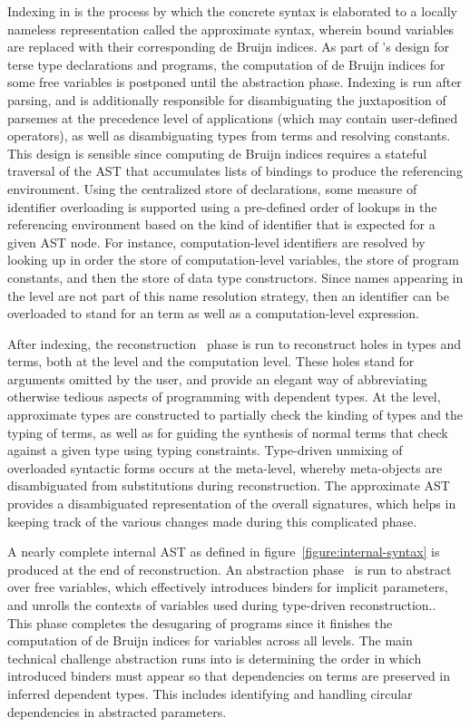 Indexing in \Beluga is the process by which the concrete syntax is elaborated to a locally nameless representation called the approximate syntax, wherein bound variables are replaced with their corresponding de Bruijn indices.
As part of \Beluga's design for terse type declarations and programs, the computation of de Bruijn indices for some free variables is postponed until the abstraction phase.
Indexing is run after parsing, and is additionally responsible for disambiguating the juxtaposition of \LF parsemes at the precedence level of applications (which may contain user-defined operators), as well as disambiguating \LF types from terms and resolving constants.
This design is sensible since computing de Bruijn indices requires a stateful traversal of the \ac{AST} that accumulates lists of bindings to produce the referencing environment.
Using the centralized store of declarations, some measure of identifier overloading is supported using a pre-defined order of lookups in the referencing environment based on the kind of identifier that is expected for a given \ac{AST} node.
For instance, computation-level identifiers are resolved by looking up in order the store of computation-level variables, the store of program constants, and then the store of data type constructors.
Since names appearing in the \LF level are not part of this name resolution strategy, then an identifier can be overloaded to stand for an \LF term as well as a computation-level expression.

After indexing, the reconstruction~\cite{pientka2013insider} phase is run to reconstruct holes in types and terms, both at the \LF level and the computation level.
These holes stand for arguments omitted by the user, and provide an elegant way of abbreviating otherwise tedious aspects of programming with dependent types.
At the \LF level, approximate types are constructed to partially check the kinding of \LF types and the typing of \LF terms, as well as for guiding the synthesis of normal terms that check against a given type using typing constraints.
Type-driven unmixing of overloaded syntactic forms occurs at the meta-level, whereby meta-objects are disambiguated from substitutions during reconstruction.
The approximate \ac{AST} provides a disambiguated representation of the overall \Beluga signatures, which helps in keeping track of the various changes made during this complicated phase.

A nearly complete internal \ac{AST} as defined in figure~\ref{figure:internal-syntax} is produced at the end of reconstruction.
An abstraction phase~\cite{germain2010implementation} is run to abstract over free variables, which effectively introduces binders for implicit parameters, and unrolls the contexts of variables used during type-driven reconstruction..
This phase completes the desugaring of \Beluga programs since it finishes the computation of de Bruijn indices for variables across all levels.
The main technical challenge abstraction runs into is determining the order in which introduced binders must appear so that dependencies on terms are preserved in inferred dependent types.
This includes identifying and handling circular dependencies in abstracted parameters.

